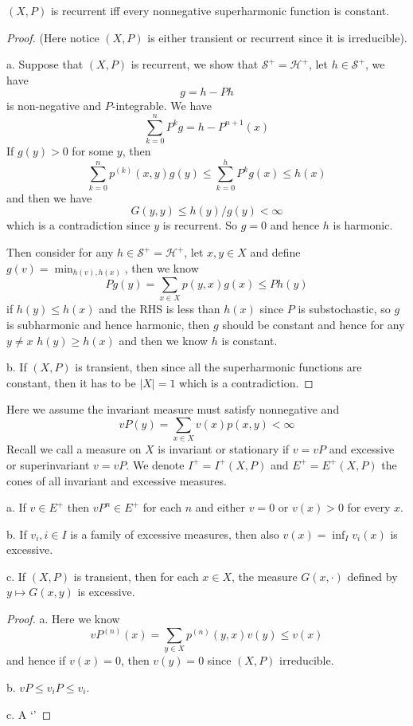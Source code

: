 \documentclass[lang=en, color=blue, ]{elegantbook}
\newcommand{\Har}{\mathcal{H}}
\newcommand{\Sar}{\mathcal{S}}
\begin{document}
\begin{theorem}
    $(X,P)$ is recurrent iff every nonnegative superharmonic function is constant.
\end{theorem}
\begin{proof}
    (Here notice $(X,P)$ is either transient or recurrent since it is irreducible).\par
    a. Suppose that $(X,P)$ is recurrent, we show that $\Sar^+ = \Har^+$, let $h\in \Sar ^+$, we have
    \[g = h - Ph\]
    is non-negative and $P$-integrable. We have
    \[
    \sum_{k=0}^n P^kg = h-P^{n+1}(x)
    \]
    If $g(y) > 0$ for some $y$, then
    \[
    \sum\limits_{k=0}^{n}p^{(k)}(x,y)g(y) \leq \sum_{k=0}^h P^kg(x) \leq h(x)
    \]
    and then we have
    \[
    G(y,y) \leq h(y)/g(y) < \infty
    \]
    which is a contradiction since $y$ is recurrent. So $g = 0$ and hence $h$ is harmonic.\par
    Then consider for any $h\in \Sar^+ = \Har^+$, let $x,y\in X$ and define $g(v) = \min_{h(v),h(x)}$, then we know
    \[
    Pg(y) = \sum\limits_{x\in X}p(y,x) g(x) \leq Ph(y) 
    \]
    if $h(y) \leq h(x)$ and the RHS is less than $h(x)$ since $P$ is substochastic, so $g$ is subharmonic and hence harmonic, then $g$ should be constant and hence for any $y\neq x$ $h(y) \geq h(x)$ and then we know $h$ is constant.\par
    b. If $(X,P)$ is transient, then since all the superharmonic functions are constant, then it has to be $|X| = 1$ which is a contradiction.
\end{proof}

\begin{definition}
    Here we assume the invariant measure must satisfy nonnegative and
    \[vP(y) = \sum\limits_{x\in X}v(x)p(x,y) < \infty\]
    Recall we call a measure on $X$ is invariant or stationary if $v= vP$ and excessive or superinvariant $v=vP$. We denote $I^+ = I^+(X,P)$ and $E^+ = E^+(X,P)$ the cones of all invariant and excessive measures.
\end{definition}

\begin{proposition}
    a. If $v\in E^+$ then $vP^n\in E^+$ for each $n$ and either $v = 0$ or $v(x) > 0$ for every $x$.\par
    b. If $v_i, i\in I$ is a family of excessive measures, then also $v(x) = \inf_I v_i(x)$ is excessive.\par
    c. If $(X,P)$ is transient, then for each $x\in X$, the measure $G(x,\cdot)$ defined by $y\mapsto G(x,y)$ is excessive.
\end{proposition}
\begin{proof}
    a. Here we know
    \[
    vP^{(n)}(x) = \sum\limits_{y\in X}p^{(n)}(y,x)v(y) \leq v(x)
    \]
    and hence if $v(x) = 0$, then $v(y) = 0$ since $(X,P)$ irreducible.\par
    b. $vP \leq v_i P \leq v_i$.\par
    c. A    `'
\end{proof}
\end{document}
